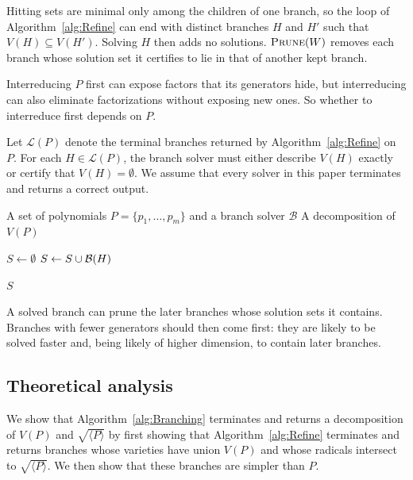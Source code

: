 Hitting sets are minimal only among the children of one branch, so the loop
of Algorithm~\ref{alg:Refine} can end with distinct branches $H$ and $H'$
such that $V(H)\subseteq V(H')$. Solving $H$ then adds no solutions.
$\Call{Prune}{W}$ removes each branch whose solution set it certifies to lie
in that of another kept branch.

Interreducing $P$ first can expose factors that its generators hide,
but interreducing can also eliminate factorizations without exposing new ones.
So whether to interreduce first depends on $P$.

Let $\mathcal L(P)$ denote the terminal branches returned by
Algorithm~\ref{alg:Refine} on $P$.
For each $H\in\mathcal L(P)$, the branch solver must either describe
$V(H)$ exactly or certify that $V(H)=\emptyset$.
We assume that every solver in this paper terminates and returns a
correct output.

\begin{algorithm}[htbp]
  \caption{Factor branching}
  \label{alg:Branching}
  \begin{algorithmic}[1]
    \Require A set of polynomials $P = \{p_1, \ldots, p_m\}$ and a
    branch solver $\mathcal{B}$
    \Ensure A decomposition of $V(P)$

    \State $S \gets \emptyset$ 
    \State $S \gets S \cup \Call{$\mathcal{B}$}{H}$
    \EndFor

    \State \Return $S$
  \end{algorithmic}
\end{algorithm}

A solved branch can prune the later branches whose solution sets it contains.
Branches with fewer generators should then come first: they are likely to be
solved faster and, being likely of higher dimension, to contain later
branches.

\subsection{Theoretical analysis}
\label{subsec:branching-theoretical-analysis}

We show that Algorithm~\ref{alg:Branching} terminates and returns a
decomposition of $V(P)$ and $\sqrt{\langle P\rangle}$ by first showing that
Algorithm~\ref{alg:Refine} terminates and returns branches whose varieties
have union $V(P)$ and whose radicals intersect to $\sqrt{\langle P\rangle}$.
We then show that these branches are simpler than $P$.

